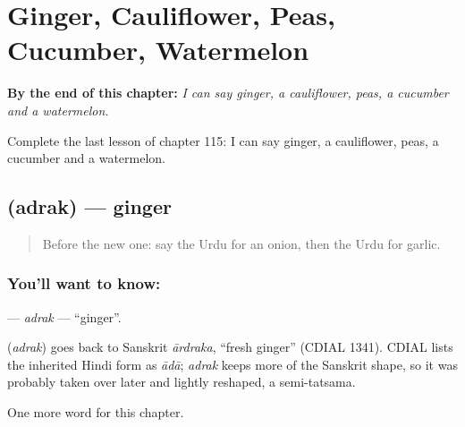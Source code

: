 
\chapter{Ginger, Cauliflower, Peas, Cucumber, Watermelon}
\label{ch:ur-ginger-cauliflower-peas-cucumber-watermelon}

\begin{chapteropening}
\textbf{By the end of this chapter:} \emph{I can say ginger, a cauliflower, peas, a cucumber and a watermelon.}

Complete the last lesson of chapter 115: I can say ginger, a cauliflower, peas, a cucumber and a watermelon.
\end{chapteropening}

\section[\texorpdfstring{\ur{ادرک} (adrak)}{ادرک (adrak)}]{ (adrak) — ginger}

\label{lesson:UR-C115-adrak}



\begin{quote}
Before the new one: say the Urdu for an onion, then the Urdu for garlic.
\end{quote}

\subsection*{You'll want to know: }
\textbf{} — \emph{adrak} — \textquotedblleft{}ginger\textquotedblright{}.

\begin{cousinweb}
\textbf{} (\emph{adrak}) goes back to Sanskrit \emph{ārdraka}, \textquotedblleft{}fresh ginger\textquotedblright{} (CDIAL 1341). CDIAL lists the inherited Hindi form as \emph{ādā}; \emph{adrak} keeps more of the Sanskrit shape, so it was probably taken over later and lightly reshaped, a semi-tatsama.
\end{cousinweb}

\begin{grammarlens}[title={What you've built}]
One more word for this chapter.
\end{grammarlens}

